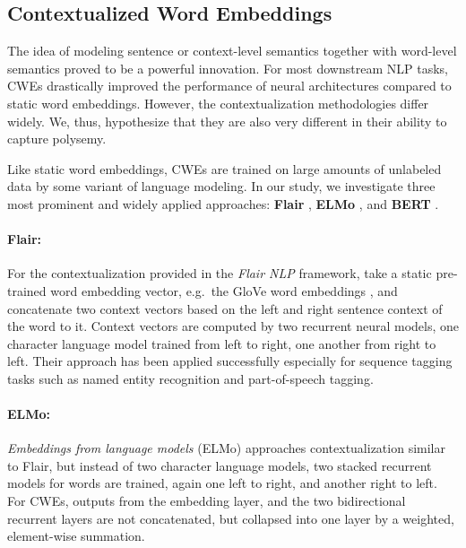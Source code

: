 \documentclass[11pt]{article}
\begin{document}
\subsection{Contextualized Word Embeddings}The idea of modeling sentence or context-level semantics together with word-level semantics proved to be a powerful innovation.
For most downstream NLP tasks, CWEs drastically improved the performance of neural architectures compared to static word embeddings. 
However, the contextualization methodologies differ widely. 
We, thus, hypothesize that they are also very different in their ability to capture polysemy.

Like static word embeddings, CWEs are trained on large amounts of unlabeled data by some variant of language modeling.
In our study, we investigate three most prominent and widely applied approaches: \textbf{Flair} \cite{akbik.2018}, \textbf{ELMo} \cite{peters.2018}, and \textbf{BERT} \cite{devlin.2019}. 

\paragraph{Flair:}For the contextualization provided in the \textit{Flair NLP} framework,  take a static pre-trained word embedding vector, e.g.\ the GloVe word embeddings \cite{pennington2014glove}, and concatenate two context vectors based on the left and right sentence context of the word to it. 
Context vectors are computed by two recurrent neural models, one character language model trained from left to right, one another from right to left. 
Their approach has been applied successfully especially for sequence tagging tasks such as named entity recognition and part-of-speech tagging.

\paragraph{ELMo:}\textit{Embeddings from language models} (ELMo) \cite{peters.2018} approaches contextualization similar to Flair, but instead of two character language models, two stacked recurrent models for words are trained, again one left to right, and another right to left. 
For CWEs, outputs from the embedding layer, and the two bidirectional recurrent layers are not concatenated, but collapsed into one layer by a weighted, element-wise summation.
\end{document}
